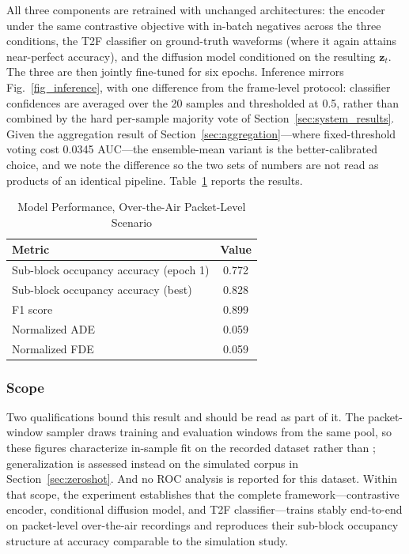 \documentclass[lettersize,journal]{IEEEtran}
\begin{document}
All three components are retrained with unchanged architectures: the encoder
under the same contrastive objective with in-batch negatives across the three
conditions, the T2F classifier on ground-truth waveforms (where it again attains
near-perfect accuracy), and the diffusion model conditioned on the resulting
$\mathbf{z}_t$. The three are then jointly fine-tuned for six epochs. Inference
mirrors Fig.~\ref{fig_inference}, with one difference from the frame-level
protocol: classifier confidences are averaged over the 20 samples and
thresholded at 0.5, rather than combined by the hard per-sample majority vote of
Section~\ref{sec:system_results}. Given the aggregation result of
Section~\ref{sec:aggregation}---where fixed-threshold voting cost 0.0345
AUC---the ensemble-mean variant is the better-calibrated choice, and we note the
difference so the two sets of numbers are not read as products of an identical
pipeline. Table~\ref{tab:ota} reports the results.

\begin{table}[t]
\centering
\caption{Model Performance, Over-the-Air Packet-Level Scenario}
\label{tab:ota}
\renewcommand{\arraystretch}{1.2}
\begin{tabular}{@{}lc@{}}
\toprule
\textbf{Metric} & \textbf{Value} \\
\midrule
Sub-block occupancy accuracy (epoch 1) & 0.772 \\
Sub-block occupancy accuracy (best)    & 0.828 \\
F1 score                               & 0.899 \\
Normalized ADE                         & 0.059 \\
Normalized FDE                         & 0.059 \\
\bottomrule
\end{tabular}
\end{table}

\subsubsection{Scope}
Two qualifications bound this result and should be read as part of it. The
packet-window sampler draws training and evaluation windows from the same pool,
so these figures characterize in-sample fit on the recorded dataset rather than
; generalization is assessed instead on the simulated
corpus in Section~\ref{sec:zeroshot}. And no ROC analysis is reported for this
dataset. Within that scope, the experiment establishes that the complete
framework---contrastive encoder, conditional diffusion model, and T2F
classifier---trains stably end-to-end on packet-level over-the-air recordings
and reproduces their sub-block occupancy structure at accuracy comparable to the
simulation study.
\end{document}
